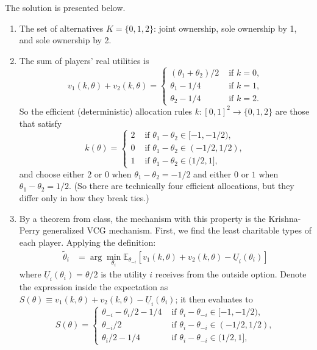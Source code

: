 \documentclass[a4paper]{article}
\begin{document}
	The solution is presented below.
	\begin{enumerate}
		\item The set of alternatives $K=\{0,1,2\}$: joint ownership, sole ownership by 1, and sole ownership by 2.
		
		\item The sum of players' real utilities is
		\begin{equation*}
			v_1(k,\theta)+v_2(k,\theta)
			= 
			\begin{cases}
				( \theta_1 + \theta_2 ) / 2	&\text{ if } k=0, \\
				\theta_1 - 1/4				&\text{ if } k=1, \\
				\theta_2 - 1/4				&\text{ if } k=2 .
			\end{cases}
		\end{equation*}
		So the efficient (deterministic) allocation rules $k : [0,1]^2 \to \{0,1,2\}$ are those that satisfy
		\begin{equation*}
			k(\theta)
			= 
			\begin{cases}
				2 &\text{ if } \theta_1-\theta_2 \in [-1,-1/2) ,
				\\
				0 &\text{ if } \theta_1-\theta_2 \in (-1/2,1/2) ,
				\\
				1 &\text{ if } \theta_1-\theta_2 \in (1/2,1] ,
			\end{cases}
		\end{equation*}
		and choose either $2$ or $0$ when $\theta_1-\theta_2=-1/2$ and either $0$ or $1$ when $\theta_1-\theta_2=1/2$. (So there are technically four efficient allocations, but they differ only in how they break ties.)
		
		\item By a theorem from class, the mechanism with this property is the Krishna-Perry generalized VCG mechanism. First, we find the least charitable types of each player. Applying the definition:
		\begin{align*}
			\tilde{\theta}_i &= \arg \min_{\theta_i} \mathbb{E}_{\theta_{-i}} \left[ v_1(k,\theta)+v_2(k,\theta) - \underline{U}_i(\theta_i) \right]
		\end{align*}
		where $\underline{U}_i(\theta_i) = \theta/2$ is the utility $i$ receives from the outside option. Denote the expression inside the expectation as $S(\theta) \equiv v_1(k,\theta)+v_2(k,\theta) - \underline{U}_i(\theta_i)$; it then evaluates to 
		\begin{equation*}
			S(\theta)
			= 
			\begin{cases}
				\theta_{-i} - \theta_{i}/2 - 1/4 &\text{ if } \theta_i-\theta_{-i} \in [-1,-1/2) ,
				\\
				\theta_{-i}/2 &\text{ if } \theta_i-\theta_{-i} \in (-1/2,1/2) ,
				\\
				\theta_i/2 - 1/4 &\text{ if } \theta_i-\theta_{-i} \in (1/2,1] ,
			\end{cases}
		\end{equation*}
		

\end{enumerate}
\end{document}
